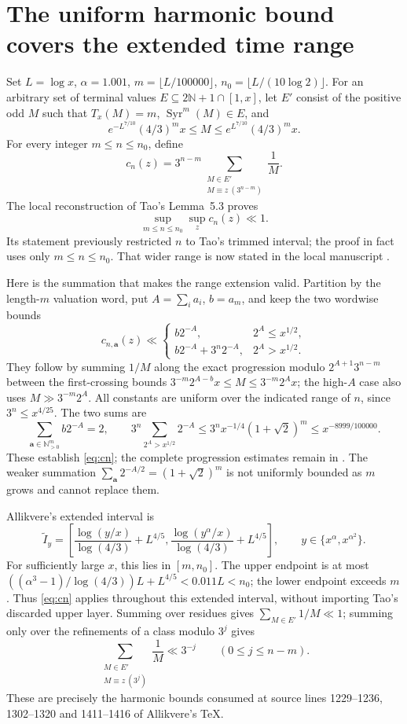 \documentclass[11pt]{article}
\theoremstyle{remark}\newtheorem{remark}[proposition]{Remark}
\newcommand{\NN}{\mathbb N}
\newcommand{\Syr}{\operatorname{Syr}}
\begin{document}
\section{The uniform harmonic bound covers the extended time range}

Set $L=\log x$, $\alpha=1.001$,
$m=\lfloor L/100000\rfloor$, $n_0=\lfloor L/(10\log2)\rfloor$.
For an arbitrary set of terminal values $E\subseteq2\NN+1\cap[1,x]$,
let $E'$ consist of the positive odd $M$ such that $T_x(M)=m$,
$\Syr^m(M)\in E$, and
\[
 e^{-L^{7/10}}(4/3)^m x\leq M\leq e^{L^{7/10}}(4/3)^m x.
\]
For every integer $m\leq n\leq n_0$, define
\[
 c_n(z)=3^{n-m}\sum_{\substack{M\in E'\\M\equiv z\ (3^{n-m})}}\frac1M.
\]
The local reconstruction of Tao's Lemma~5.3 proves
\begin{equation}\label{eq:cn}
 \sup_{m\leq n\leq n_0}\sup_z c_n(z)\ll1.
\end{equation}
Its statement previously restricted $n$ to Tao's trimmed interval;
the proof in fact uses only $m\leq n\leq n_0$. That wider range is now
stated in the local manuscript \cite{LocalRepair}.

Here is the summation that makes the range extension valid. Partition by
the length-$m$ valuation word, put $A=\sum_i a_i$, $b=a_m$, and keep the
two wordwise bounds
\[
 c_{n,\mathbf a}(z)\ll
 \begin{cases}
 b2^{-A},&2^A\leq x^{1/2},\\
 b2^{-A}+3^n2^{-A},&2^A>x^{1/2}.
 \end{cases}
\]
They follow by summing $1/M$ along the exact progression modulo
$2^{A+1}3^{n-m}$ between the first-crossing bounds
$3^{-m}2^{A-b}x\leq M\leq3^{-m}2^Ax$; the high-$A$ case also uses
$M\gg3^{-m}2^A$. All constants are uniform over the indicated range of
$n$, since $3^n\leq x^{4/25}$.
The two sums are
\[
 \sum_{\mathbf a\in\NN_{>0}^m} b2^{-A}=2,
 \qquad
 3^n\sum_{2^A>x^{1/2}}2^{-A}
 \leq3^n x^{-1/4}(1+\sqrt2)^m
 \leq x^{-8999/100000}.
\]
These establish \eqref{eq:cn}; the complete progression estimates remain
in \cite{LocalRepair}. The weaker summation
$\sum_{\mathbf a}2^{-A/2}=(1+\sqrt2)^m$ is not uniformly bounded as
$m$ grows and cannot replace them.

Allikvere's extended interval is
\[
 \widetilde I_y=
 \left[\frac{\log(y/x)}{\log(4/3)}+L^{4/5},
       \frac{\log(y^\alpha/x)}{\log(4/3)}+L^{4/5}\right],
 \qquad y\in\{x^\alpha,x^{\alpha^2}\}.
\]
For sufficiently large $x$, this lies in $[m,n_0]$. The upper endpoint
is at most $((\alpha^3-1)/\log(4/3))L+L^{4/5}<0.011L<n_0$;
the lower endpoint exceeds $m$. Thus \eqref{eq:cn} applies throughout
this extended interval, without importing Tao's discarded upper layer.
Summing over residues gives $\sum_{M\in E'}1/M\ll1$; summing only over
the refinements of a class modulo $3^j$ gives
\[
 \sum_{\substack{M\in E'\\M\equiv z\ (3^j)}}\frac1M\ll3^{-j}
 \qquad(0\leq j\leq n-m).
\]
These are precisely the harmonic bounds consumed at source lines
1229--1236, 1302--1320 and 1411--1416 of Allikvere's TeX.
\end{document}
